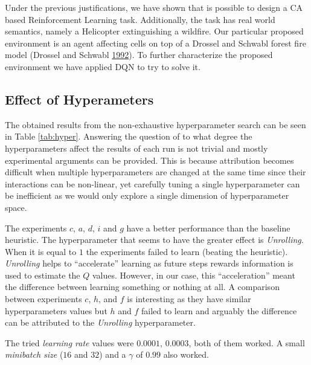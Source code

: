 \documentclass[
  12pt,
  openany]{book}
\begin{document}
Under the previous justifications, we have shown that is possible to design a CA based Reinforcement Learning task. Additionally, the task has real world semantics, namely a Helicopter extinguishing a wildfire. Our particular proposed environment is an agent affecting cells on top of a Drossel and Schwabl forest fire model (Drossel and Schwabl \protect\hyperlink{ref-drossel1992self}{1992}). To further characterize the proposed environment we have applied DQN to try to solve it.

\hypertarget{effect-of-hyperameters}{%
\subsection{Effect of Hyperameters}\label{effect-of-hyperameters}}

The obtained results from the non-exhaustive hyperparameter search can be seen in Table \ref{tab:hyper}. Answering the question of to what degree the hyperparameters affect the results of each run is not trivial and mostly experimental arguments can be provided. This is because attribution becomes difficult when multiple hyperparameters are changed at the same time since their interactions can be non-linear, yet carefully tuning a single hyperparameter can be inefficient as we would only explore a single dimension of hyperparameter space.

The experiments \(c\), \(a\), \(d\), \(i\) and \(g\) have a better performance than the baseline heuristic. The hyperparameter that seems to have the greater effect is \emph{Unrolling}. When it is equal to \(1\) the experiments failed to learn (beating the heuristic). \emph{Unrolling} helps to ``accelerate'' learning as future steps rewards information is used to estimate the \(Q\) values. However, in our case, this ``acceleration'' meant the difference between learning something or nothing at all. A comparison between experiments \(c\), \(h\), and \(f\) is interesting as they have similar hyperparameters values but \(h\) and \(f\) failed to learn and arguably the difference can be attributed to the \emph{Unrolling} hyperparameter.

The tried \emph{learning rate} values were \(0.0001\), \(0.0003\), both of them worked. A small \emph{minibatch size} (\(16\) and \(32\)) and a \(\gamma\) of \(0.99\) also worked.
\end{document}
